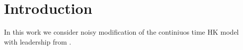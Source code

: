 \section{Introduction}

In this work we consider noisy modification of the continiuos time HK model with leadership from \cite{leader_hk}.  